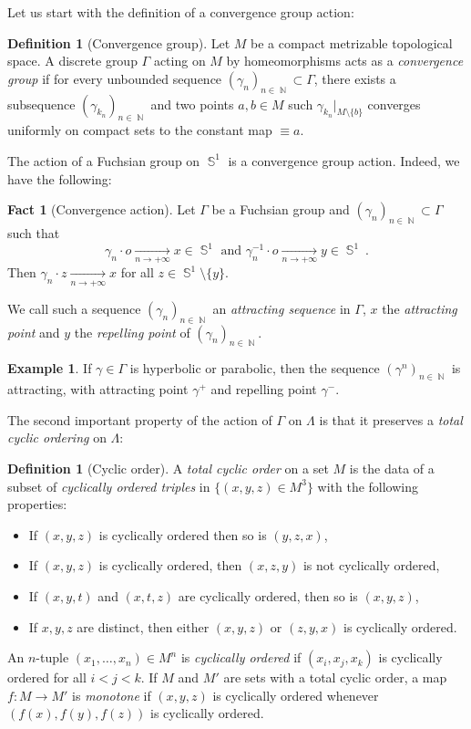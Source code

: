 \documentclass{amsart}
\theoremstyle{plain}
\theoremstyle{definition}
\newtheorem{example}[proposition]{Example}
\newtheorem{definition}[proposition]{Definition}
\newtheorem{fact}[proposition]{Fact}
\DeclareMathOperator{\Nb}{{\mathbb{N}}}
\DeclareMathOperator{\Sb}{\mathbb{S}}
\newcommand{\1}{\mathbf{1}}
\begin{document}
Let us start with the definition of a convergence group action:

\begin{definition}[Convergence group]
    Let $M$ be a compact metrizable topological space. A discrete group $\Gamma$ acting on $M$ by homeomorphisms acts as a \emph{convergence group} if for every unbounded sequence $(\gamma_n)_{n\in \Nb}\subset \Gamma$, there exists a subsequence $(\gamma_{k_n})_{n\in \Nb}$ and two points $a,b \in M$ such $\gamma_{k_n}\vert_{M\setminus \{b\}}$ converges uniformly on compact sets to the constant map $\equiv a$.
\end{definition}

The action of a Fuchsian group on $\Sb^1$ is a convergence group action. Indeed, we have the following:
\begin{fact}[Convergence action] \label{fact: Fuchsian groups are convergence groups}
    Let $\Gamma$ be a Fuchsian group and $(\gamma_n)_{n\in \Nb} \subset \Gamma$ such that \[\gamma_n\cdot o \underset{n\to +\infty}{\longrightarrow} x \in \Sb^1 \textrm{ and } \gamma_n^{-1}\cdot o \underset{n\to +\infty}{\longrightarrow} y\in \Sb^1~.\] Then $\gamma_n\cdot z \underset{n\to +\infty}{\longrightarrow} x$ for all $z\in \Sb^1\setminus \{y\}$.
\end{fact}

 We call such a sequence $(\gamma_n)_{n\in \Nb}$ an \emph{attracting sequence} in $\Gamma$, $x$ the \emph{attracting point} and $y$ the \emph{repelling point} of $(\gamma_n)_{n\in \Nb}$.

 \begin{example}
     If $\gamma \in \Gamma$ is hyperbolic or parabolic, then the sequence $(\gamma^n)_{n\in \Nb}$ is attracting, with attracting point $\gamma^+$ and repelling point $\gamma^-$.
 \end{example}


The second important property of the action of $\Gamma$ on $\Lambda$ is that it preserves a \emph{total cyclic ordering} on $\Lambda$:

\begin{definition}[Cyclic order]
\label{dfn:CyclicOrder}
    A \emph{total cyclic order} on a set $M$ is the data of a subset of \emph{cyclically ordered triples} in $\{(x,y,z)\in M^3\}$ with the following properties:
    \begin{itemize}
        \item If $(x,y,z)$ is cyclically ordered then so is $(y,z,x)$,
        \item If $(x,y,z)$ is cyclically ordered, then $(x,z,y)$ is not cyclically ordered,
        \item If $(x,y,t)$ and $(x,t,z)$ are cyclically ordered, then so is $(x,y,z)$,
        \item If $x,y,z$ are distinct, then either $(x,y,z)$ or $(z,y,x)$ is cyclically ordered.
    \end{itemize}
    An $n$-tuple $(x_1,\ldots, x_n)\in M^n$ is \emph{cyclically ordered} if $(x_i,x_j,x_k)$ is cyclically ordered for all $i<j<k$.
    If $M$ and $M'$ are sets with a total cyclic order, a map $f:M\to M'$ is \emph{monotone} if $(x,y,z)$ is cyclically ordered whenever $(f(x),f(y),f(z))$ is cyclically ordered.
\end{definition}
\end{document}
